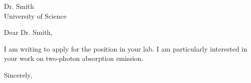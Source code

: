 \documentclass[11pt,a4paper]{letter}
\begin{document}
\begin{letter}{ Dr. Smith \\ University of Science }

\opening{Dear Dr. Smith,}


I am writing to apply for the position in your lab. 
I am particularly interested in your work on two-photon absorption emission.
        

\closing{Sincerely,}

\end{letter}

\end{document}
